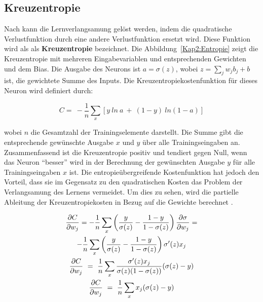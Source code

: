     \subsection{Kreuzentropie}
    Nach \cite*[62]{Nielsen2015} kann die Lernverlangsamung gelöst werden, indem die quadratische Verlustfunktion durch eine andere Verlustfunktion ersetzt wird. Diese Funktion wird als als \textbf{Kreuzentropie} bezeichnet. Die Abbildung~\ref{Kap2:Entropie} zeigt die Kreuzentropie mit mehreren Eingabevariablen und entsprechenden Gewichten und dem Bias. Die Ausgabe des Neurons ist $a = \sigma(z)$, wobei $z =  \sum _{j} w_{j} b_{j} + b$ ist, die gewichtete Summe des Inputs. Die Kreuzentropiekostenfunktion für dieses Neuron wird definiert durch:

    \begin{equation} \label{Formel2_8}
        C=\ -\frac{1}{n}\sum _{x}[ y\ ln\ a\ +\ ( 1-y) \ ln( 1-a)]
    \end{equation}

    wobei $n$ die Gesamtzahl der Trainingselemente darstellt. Die Summe gibt die entsprechende gewünschte Ausgabe $x$ und $y$ über alle Trainingseingaben an. Zusammenfassend ist die Kreuzentropie positiv und tendiert gegen Null, wenn das Neuron
    \enquote{besser} wird in der Berechnung der gewünschten Ausgabe $y$ für alle Trainingseingaben $x$ ist.  Die entropieübergreifende Kostenfunktion hat jedoch den Vorteil, dass sie im Gegensatz zu den quadratischen Kosten das Problem der Verlangsamung des Lernens vermeidet. Um dies zu sehen, wird die partielle Ableitung der Kreuzentropiekosten in Bezug auf die Gewichte berechnet \cite*[63]{Nielsen2015}.

    \begin{gather} \label{Formel2_9}
        \frac{\partial C}{\partial w_{j}} =-\frac{1}{n}\sum _{x}\left(\frac{y}{\sigma ( z)} -\frac{1-y}{1-\sigma ( z)}\right)\frac{\partial \sigma }{\partial w_{j}} = \notag\\
        -\frac{1}{n}\sum _{x}\left(\frac{y}{\sigma ( z)} -\frac{1-y}{1-\sigma ( z)}\right) \sigma '( z) x_{j}
        \notag\\
        \frac{\partial C}{\partial w_{j}} \ =\ \frac{1}{n}\sum _{x}\frac{\sigma '( z) x_{j}}{\sigma ( z)( 1-\sigma ( z))}( \sigma ( z) -y)
        \notag\\
        \frac{\partial C}{\partial w_{j}} \ =\ \frac{1}{n}\sum _{x} x_{j}( \sigma ( z) -y)
    \end{gather}

